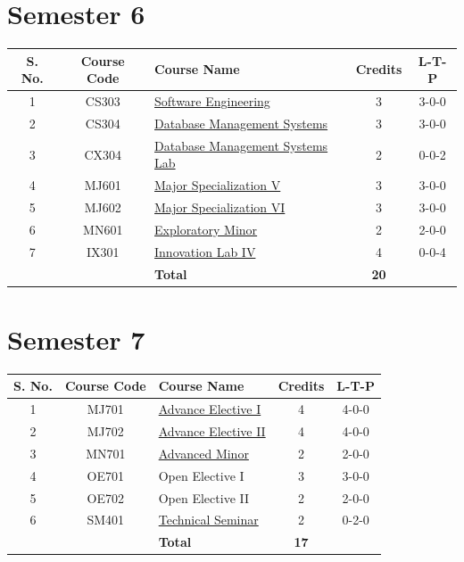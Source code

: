 \section*{Semester 6}
\begin{longtable}{|c|c|p{7cm}|c|c|}
\hline
\textbf{S. No.} & \textbf{Course Code} & \textbf{Course Name} & \textbf{Credits} & \textbf{L-T-P} \\
\hline
1 & CS303 & \hyperref[course:CS303]{Software Engineering} & 3 & 3-0-0 \\
\hline
2 & CS304 & \hyperref[course:CS304]{Database Management Systems} & 3 & 3-0-0 \\
\hline
3 & CX304 & \hyperref[course:CX304]{Database Management Systems Lab} & 2 & 0-0-2 \\
\hline
4 & MJ601 & \hyperref[table:major5]{Major Specialization V} & 3 & 3-0-0 \\
\hline
5 & MJ602 & \hyperref[table:major6]{Major Specialization VI} & 3 & 3-0-0 \\
\hline
6 & MN601 & \hyperref[table:minor_l1]{Exploratory Minor} & 2 & 2-0-0 \\
\hline
7 & IX301 & \hyperref[course:IX301]{Innovation Lab IV} & 4 & 0-0-4 \\
\hline
& & \textbf{Total} & \textbf{20} & \\
\hline
\end{longtable}

\newpage

\section*{Semester 7}
\begin{longtable}{|c|c|p{7cm}|c|c|}
\hline
\textbf{S. No.} & \textbf{Course Code} & \textbf{Course Name} & \textbf{Credits} & \textbf{L-T-P} \\
\hline
1 & MJ701 & \hyperref[table:electives]{Advance Elective I} & 4 & 4-0-0 \\
\hline
2 & MJ702 & \hyperref[table:electives]{Advance Elective II} & 4 & 4-0-0 \\
\hline
3 & MN701 & \hyperref[table:minor_l2]{Advanced Minor} & 2 & 2-0-0 \\
\hline
4 & OE701 & Open Elective I & 3 & 3-0-0 \\
\hline
5 & OE702 & Open Elective II & 2 & 2-0-0 \\
\hline
6 & SM401 & \hyperref[course:SM401]{Technical Seminar} & 2 & 0-2-0 \\
\hline
& & \textbf{Total} & \textbf{17} & \\
\hline
\end{longtable}

